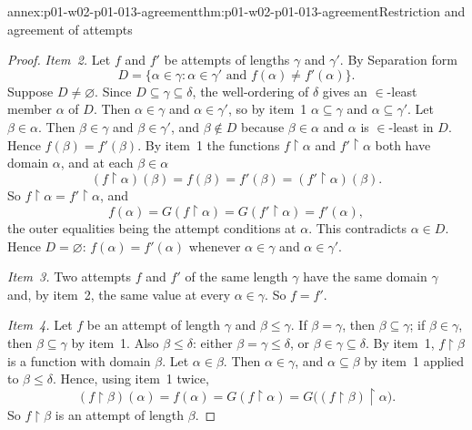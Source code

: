 \begin{annexitem}{annex:p01-w02-p01-013-agreement}{thm:p01-w02-p01-013-agreement}{Restriction and agreement of attempts}
\begin{proof}
\emph{Item~2.} Let \(f\) and \(f'\) be attempts of lengths \(\gamma\) and
\(\gamma'\). By Separation form
\[
  D=\{\alpha\in\gamma:\alpha\in\gamma'\text{ and }f(\alpha)\ne f'(\alpha)\}.
\]
Suppose \(D\ne\varnothing\). Since \(D\subseteq\gamma\subseteq\delta\), the
well-ordering of \(\delta\) gives an \(\in\)-least member \(\alpha\) of
\(D\). Then \(\alpha\in\gamma\) and \(\alpha\in\gamma'\), so by item~1
\(\alpha\subseteq\gamma\) and \(\alpha\subseteq\gamma'\). Let
\(\beta\in\alpha\). Then \(\beta\in\gamma\) and \(\beta\in\gamma'\), and
\(\beta\notin D\) because \(\beta\in\alpha\) and \(\alpha\) is
\(\in\)-least in \(D\). Hence \(f(\beta)=f'(\beta)\). By item~1 the functions
\(f\mathbin{\upharpoonright}\alpha\) and \(f'\mathbin{\upharpoonright}\alpha\)
both have domain \(\alpha\), and at each \(\beta\in\alpha\)
\[
  (f\mathbin{\upharpoonright}\alpha)(\beta)=f(\beta)=f'(\beta)
  =(f'\mathbin{\upharpoonright}\alpha)(\beta).
\]
So \(f\mathbin{\upharpoonright}\alpha=f'\mathbin{\upharpoonright}\alpha\), and
\[
  f(\alpha)=G(f\mathbin{\upharpoonright}\alpha)
  =G(f'\mathbin{\upharpoonright}\alpha)=f'(\alpha),
\]
the outer equalities being the attempt conditions at \(\alpha\). This
contradicts \(\alpha\in D\). Hence \(D=\varnothing\): \(f(\alpha)=f'(\alpha)\)
whenever \(\alpha\in\gamma\) and \(\alpha\in\gamma'\).

\emph{Item~3.} Two attempts \(f\) and \(f'\) of the same length \(\gamma\)
have the same domain \(\gamma\) and, by item~2, the same value at every
\(\alpha\in\gamma\). So \(f=f'\).

\emph{Item~4.} Let \(f\) be an attempt of length \(\gamma\) and
\(\beta\leq\gamma\). If \(\beta=\gamma\), then \(\beta\subseteq\gamma\); if
\(\beta\in\gamma\), then \(\beta\subseteq\gamma\) by item~1. Also
\(\beta\leq\delta\): either \(\beta=\gamma\leq\delta\), or
\(\beta\in\gamma\subseteq\delta\). By item~1,
\(f\mathbin{\upharpoonright}\beta\) is a function with domain \(\beta\). Let
\(\alpha\in\beta\). Then \(\alpha\in\gamma\), and \(\alpha\subseteq\beta\) by
item~1 applied to \(\beta\leq\delta\). Hence, using item~1 twice,
\[
  (f\mathbin{\upharpoonright}\beta)(\alpha)=f(\alpha)
  =G(f\mathbin{\upharpoonright}\alpha)
  =G\bigl((f\mathbin{\upharpoonright}\beta)\mathbin{\upharpoonright}\alpha\bigr).
\]
So \(f\mathbin{\upharpoonright}\beta\) is an attempt of length \(\beta\).
\end{proof}
\end{annexitem}

